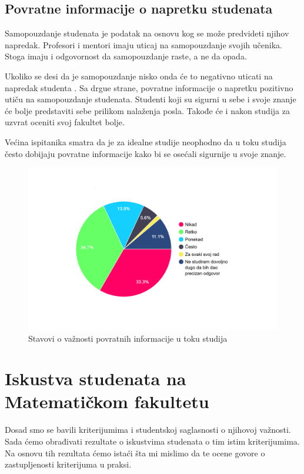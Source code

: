 \documentclass[a4paper]{article}
\begin{document}
{\subsection{Povratne informacije o napretku studenata}
\label{subsec:povrane_informacije}

Samopouzdanje studenata je podatak na osnovu kog se može predvideti njihov napredak\cite{correlation}.
Profesori i mentori imaju uticaj na samopouzdanje svojih učenika. Stoga imaju i odgovornost da samopouzdanje raste, a ne da opada.

Ukoliko se desi da je samopouzdanje nisko onda će to negativno uticati na napredak studenta \cite{confidence}. Sa drgue strane, povratne informacije o napretku pozitivno utiču na samopouzdanje studenata. Studenti koji su sigurni u sebe i svoje znanje će bolje predstaviti sebe prilikom nalaženja posla. Takođe će i nakon studija za uzvrat oceniti svoj fakultet bolje. 

Većina ispitanika smatra da je za idealne studije neophodno da u toku studija često dobijaju povratne informacije kako bi se osećali sigurnije u svoje znanje. 
\begin{figure}[h!]
\begin{center}
    \includegraphics[width=0.7\linewidth]{Slike/PieChartPovratneInformacije.png}
    \caption{Stavovi o važnosti povratnih informacije u toku studija}
    \label{fig:povratne_informacije}
\end{center}
\end{figure}

\section{Iskustva studenata na Matematičkom fakultetu}
\label{sec:iskustva}

Dosad smo se bavili kriterijumima i studentskoj saglasnosti o njihovoj važnosti. Sada ćemo obrađivati rezultate o iskustvima studenata o tim istim kriterijumima. Na osnovu tih rezultata ćemo istaći šta mi mislimo da te ocene govore o zastupljenosti kriterijuma u praksi.  

}
\end{document}
